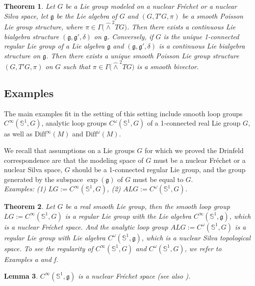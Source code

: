 \documentclass[11pt,reqno]{amsart}
\newtheorem{theorem}{Theorem}[section]
\newtheorem{lemma}[theorem]{Lemma}
\theoremstyle{definition}
\numberwithin{equation}{section}
\begin{document}
\begin{theorem}\label{D-4}
Let $G$ be a Lie group modeled on a nuclear Fréchet or a nuclear Silva space, let $\mathfrak{g}$ be the Lie algebra of $G$ and $(G, T'G, \pi)$ be a smooth Poisson Lie group structure, where $\pi \in {\Gamma(\hat\wedge}^2TG)$. Then there exists a continuous Lie bialgebra structure $(\mathfrak{g}, \mathfrak{g}', \delta)$ on $\mathfrak{g}$. Conversely, if $G$ is the unique 1-connected regular Lie group of a Lie algebra $\mathfrak{g}$ and $(\mathfrak{g}, \mathfrak{g}', \delta)$ is a continuous Lie bialgebra structure on $\mathfrak{g}$. Then there exists a unique smooth Poisson Lie group structure $(G, T'G, \pi)$ on $G$ such that $\pi \in {\Gamma(\hat\wedge}^2TG)$ is a smooth bivector.
\end{theorem}

\subsection{Examples}
The main examples fit in the setting of this setting include smooth loop groups $C^{\infty}(\mathbb{S}^{1},G)$, analytic loop groups $C^{\omega}(\mathbb{S}^{1},G)$ of a 1-connected real Lie group $G$, as well as $\mathrm{Diff}^{\infty}(M)$ and $\mathrm{Diff}^{\omega}(M)$.

We recall that assumptions on a Lie groups $G$ for which we proved the Drinfeld correspondence are that the modeling space of $G$ must be a nuclear Fréchet or a nuclear Silva space, $G$ should be a 1-connected regular Lie group, and the group generated by the subspace $\exp(\mathfrak{g})$ of $G$ must be equal to $G$.\\

\textit{Examples: (1) $LG := C^{\infty}(\mathbb{S}^1, G)$, (2) $ALG := C^{\omega}(\mathbb{S}^1, G)$. }
\begin{theorem}
Let $G$ be a real smooth Lie group, then the smooth loop group $LG := C^{\infty}(\mathbb{S}^1, G)$ is a regular Lie group with the Lie algebra $C^{\infty}(\mathbb{S}^1, \mathfrak{g})$, which is a nuclear Fréchet space. And the analytic loop group $ALG := C^{\omega}(\mathbb{S}^1, G)$ is a regular Lie group with Lie algebra $C^{\omega}(\mathbb{S}^1, \mathfrak{g})$, which is a nuclear Silva topological space. To see the regularity of $C^{\infty}(\mathbb{S}^1, G)$ and $C^{\omega}(\mathbb{S}^1, G)$, we refer to \cite{12} Examples a and f.
\end{theorem}

\begin{lemma}
$C^{\infty}(\mathbb{S}^1, \mathfrak{g})$ is a nuclear Fréchet space (see also \cite[Lemma 30.3]{20}).
\end{lemma}
\end{document}

